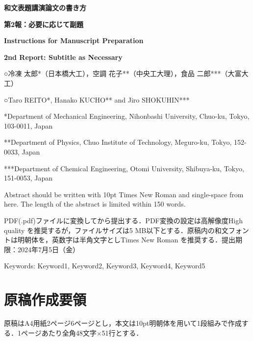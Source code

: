 \documentclass[A4,10pt,fleqn,dvipdfmx]{jarticle}
\renewcommand{\normalsize}{\fontsize{10.4pt}{13.8pt}\selectfont}     %
\begin{document}
\setlength{\mathindent}{28pt}

\begin{center}
\fontsize{12.72pt}{16pt}\selectfont 

\textbf{和文表題講演論文の書き方}

\textbf{第2報：必要に応じて副題}


\vspace{14pt}

\normalsize
\textbf{Instructions for Manuscript Preparation}

\textbf{2nd Report: Subtitle as Necessary}


\vspace{15pt}

○冷凍 太郎*（日本橋大工），空調 花子**（中央工大理），食品 二郎***（大富大工）

○Taro REITO*, Hanako KUCHO** and Jiro SHOKUHIN***

*Department of Mechanical Engineering, Nihonbashi University, Chuo-ku, Tokyo, 103-0011, Japan

**Department of Physics, Chuo Institute of Technology, Meguro-ku, Tokyo, 152-0033, Japan

***Department of Chemical Engineering, Otomi University, Shibuya-ku, Tokyo, 151-0053, Japan


\end{center}

\vspace{16pt}
Abstract should be written with 10pt Times New Roman and single-space from here. The length of the abstract is limited within 150 words. 

PDF(.pdf)ファイルに変換してから提出する．PDF変換の設定は高解像度High quality を推奨するが，ファイルサイズは5 MB以下とする．原稿内の和文フォントは明朝体を，英数字は半角文字としTimes New Roman を推奨する．提出期限：2024年7月5日（金）

\vspace{4pt}
\begin{center}
Keywords: Keyword1, Keyword2, Keyword3, Keyword4, Keyword5
\end{center}

\vspace{3pt}



\section{\textbf{原稿作成要領}}
原稿はA4用紙2ページ6ページとし，本文は10pt明朝体を用いて1段組みで作成する．1ページあたり全角48文字×51行とする．
\end{document}
